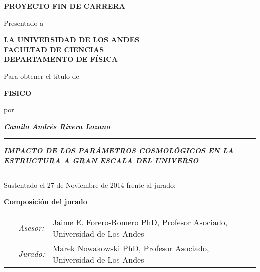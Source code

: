\thispagestyle{empty}


\begin{center}

\vspace{2.5cm}

\begin{large}
\textbf{PROYECTO FIN DE CARRERA}\\

\vspace{0.7cm}

Presentado a\\

\vspace{0.7cm}

\textbf{LA UNIVERSIDAD DE LOS ANDES\\
FACULTAD DE CIENCIAS\\
DEPARTAMENTO DE FÍSICA}\\

\vspace{1.5cm}

Para obtener el título de\\

\vspace{0.7cm}

\textbf{FISICO}\\

\vspace{1cm}

por\\ 

\vspace{0.7cm}

\textit{\textbf{Camilo Andrés Rivera Lozano}}\\

\vspace{1cm}

\rule[10pt]{\textwidth}{1pt}
\textbf{\textit{IMPACTO DE LOS PARÁMETROS COSMOLÓGICOS EN LA ESTRUCTURA A GRAN ESCALA DEL UNIVERSO}}\\
\vspace{0.7cm}
\rule[10pt]{\textwidth}{1pt}

\vspace{1cm}

Sustentado el 27 de Noviembre de 2014 frente al jurado:

\vspace{1cm}

\textbf{\underline{Composición del jurado}}

\vspace{1cm}

\end{large}

\begin{tabular}{p{}p{}p{}}
-	&	\textit{Asesor:}	&  Jaime E. Forero-Romero PhD, Profesor Asociado, Universidad de Los Andes\\
-	&	\textit{Jurado:}	&  Marek Nowakowski PhD, Profesor Asociado, Universidad de Los Andes\\
\end{tabular}

\end{center}

